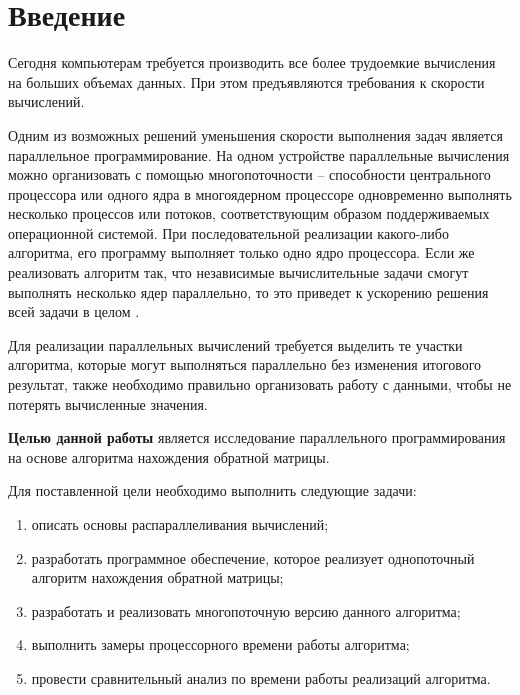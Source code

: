 \chapter*{Введение}

Сегодня компьютерам требуется производить все более трудоемкие вычисления на больших
объемах данных. При этом предъявляются требования к скорости вычислений.

Одним из возможных решений уменьшения
скорости выполнения задач является параллельное программирование. На одном
устройстве параллельные вычисления можно организовать с помощью
многопоточности -- способности центрального процессора или одного ядра
в многоядерном процессоре одновременно выполнять несколько процессов или
потоков, соответствующим образом поддерживаемых операционной системой. При
последовательной реализации какого-либо алгоритма, его программу выполняет
только одно ядро процессора. Если же реализовать алгоритм так, что независимые
вычислительные задачи смогут выполнять несколько ядер параллельно, то это
приведет к ускорению решения всей задачи в целом \cite{intro}.

Для реализации параллельных вычислений требуется выделить те участки алгоритма,
которые могут выполняться параллельно без изменения итогового результат, 
также необходимо правильно организовать работу с данными, чтобы не потерять
вычисленные значения.

\textbf{Целью данной работы} является исследование
параллельного программирования на основе алгоритма
нахождения обратной матрицы.

Для поставленной цели необходимо выполнить следующие задачи:
\begin{enumerate}
	\item описать основы распараллеливания вычислений;
	\item разработать программное обеспечение, которое реализует однопоточный алгоритм нахождения обратной матрицы;
	\item разработать и реализовать многопоточную версию данного алгоритма;
	\item выполнить замеры процессорного времени работы алгоритма;
	\item провести сравнительный анализ по времени работы реализаций алгоритма.
\end{enumerate}

